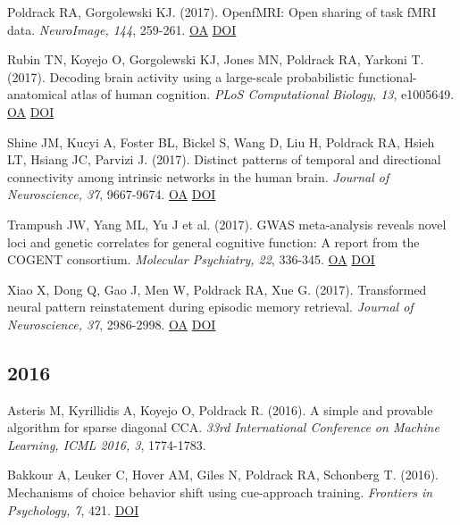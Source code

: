 \documentclass[10pt, letterpaper]{article}
\begin{document}
Poldrack RA, Gorgolewski KJ.  (2017). OpenfMRI: Open sharing of task fMRI data. \textit{NeuroImage, 144}, 259-261. \href{https://www.ncbi.nlm.nih.gov/pmc/articles/PMC4669234}{OA} \href{https://doi.org/10.1016/j.neuroimage.2015.05.073}{DOI} \vspace{2mm}

Rubin TN, Koyejo O, Gorgolewski KJ, Jones MN, Poldrack RA, Yarkoni T.  (2017). Decoding brain activity using a large-scale probabilistic functional-anatomical atlas of human cognition. \textit{PLoS Computational Biology, 13}, e1005649. \href{https://www.ncbi.nlm.nih.gov/pmc/articles/PMC5683652}{OA} \href{https://doi.org/10.1371/journal.pcbi.1005649}{DOI} \vspace{2mm}

Shine JM, Kucyi A, Foster BL, Bickel S, Wang D, Liu H, Poldrack RA, Hsieh LT, Hsiang JC, Parvizi J.  (2017). Distinct patterns of temporal and directional connectivity among intrinsic networks in the human brain. \textit{Journal of Neuroscience, 37}, 9667-9674. \href{https://www.ncbi.nlm.nih.gov/pmc/articles/PMC6596608}{OA} \href{https://doi.org/10.1523/jneurosci.1574-17.2017}{DOI} \vspace{2mm}

Trampush JW, Yang ML, Yu J et al. (2017). GWAS meta-analysis reveals novel loci and genetic correlates for general cognitive function: A report from the COGENT consortium. \textit{Molecular Psychiatry, 22}, 336-345. \href{https://www.ncbi.nlm.nih.gov/pmc/articles/PMC5322272}{OA} \href{https://doi.org/10.1038/mp.2016.244}{DOI} \vspace{2mm}

Xiao X, Dong Q, Gao J, Men W, Poldrack RA, Xue G.  (2017). Transformed neural pattern reinstatement during episodic memory retrieval. \textit{Journal of Neuroscience, 37}, 2986-2998. \href{https://www.ncbi.nlm.nih.gov/pmc/articles/PMC6596730}{OA} \href{https://doi.org/10.1523/jneurosci.2324-16.2017}{DOI} \vspace{2mm}

\subsection*{2016}Asteris M, Kyrillidis A, Koyejo O, Poldrack R.  (2016). A simple and provable algorithm for sparse diagonal CCA. \textit{33rd International Conference on Machine Learning, ICML 2016, 3}, 1774-1783. \vspace{2mm}

Bakkour A, Leuker C, Hover AM, Giles N, Poldrack RA, Schonberg T.  (2016). Mechanisms of choice behavior shift using cue-approach training. \textit{Frontiers in Psychology, 7}, 421. \href{https://doi.org/10.3389/fpsyg.2016.00421}{DOI} \vspace{2mm}
\end{document}
